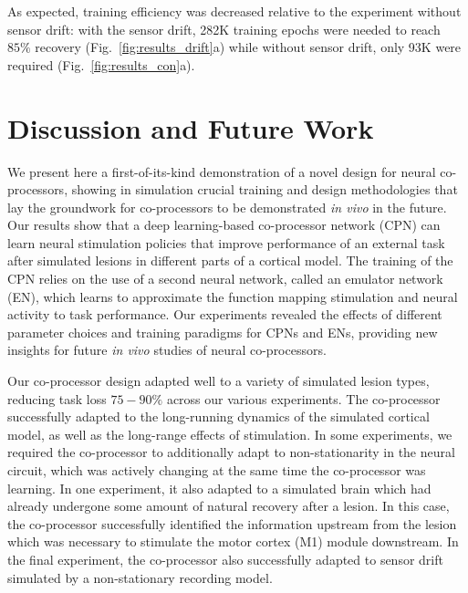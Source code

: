 \documentclass[12pt]{iopart}
\begin{document}
As expected, training efficiency was decreased relative to the experiment without sensor
drift: with the sensor drift, 282K training epochs were needed to reach $85\%$ recovery
(Fig.~\ref{fig:results_drift}a) while without sensor drift, only 93K were required
(Fig.~\ref{fig:results_con}a).

\section{Discussion and Future Work}
\label{sec:discussion}

We present here a first-of-its-kind demonstration of a novel design for neural co-processors,
showing in simulation crucial training and design methodologies that lay the groundwork for
co-processors to be demonstrated \textit{in vivo} in the future. Our results show that a deep
learning-based co-processor network (CPN) can learn neural stimulation policies that improve
performance of an external task after simulated lesions in different parts of a cortical model.
The training of the CPN relies on the use of a second neural network, called an emulator network (EN), 
which learns to approximate the function mapping stimulation and neural activity to task performance.
Our experiments revealed the effects of different parameter choices and training paradigms for CPNs and
ENs, providing new insights for future {\em in vivo} studies of neural co-processors.

Our co-processor design adapted well to a variety of simulated lesion types, reducing task loss
$75-90\%$ across our various experiments. The co-processor successfully adapted to
the long-running dynamics of the simulated cortical model, as well as the long-range effects of
stimulation. In some experiments, we required the co-processor to additionally adapt to non-stationarity in
the neural circuit, which was actively changing at the same time the co-processor was learning. In one
experiment, it also adapted to a simulated brain which had already undergone some amount of natural recovery
after a lesion. In this case, the co-processor successfully identified the information upstream from the 
lesion which was necessary to stimulate the motor cortex (M1) module downstream. In the final experiment,
the co-processor also successfully adapted to sensor drift simulated by a non-stationary recording model.
\end{document}
